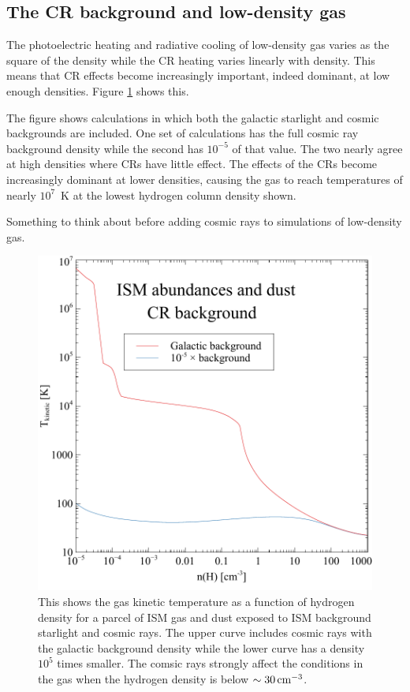 \subsection{The CR background and low-density gas}

The photoelectric heating and radiative cooling of low-density gas varies as the
square of the density while the CR heating varies linearly with density.
This means that CR effects become increasingly important, indeed dominant,
at low enough densities.
Figure \ref{fig:crDensityTemp} shows this.

The figure shows calculations in which both the galactic starlight and cosmic backgrounds 
are included.  
One set of calculations has the full cosmic ray background density while the second
has $10^{-5}$ of that value.  
The two nearly agree at high densities where CRs have little effect.
The effects of the CRs become increasingly dominant at lower densities, causing
the gas to reach temperatures of nearly $10^7$~K at the lowest hydrogen column density shown.

Something to think about before adding cosmic rays to simulations of low-density gas.

\begin{figure}
\centering
\includegraphics[scale=0.7]{crDensityTemp/crDensityTemp}
\caption[Effects of cosmic ray background on gas temperature]
{\label{fig:crDensityTemp}This shows  
the gas kinetic temperature as a function of hydrogen density for a parcel of ISM gas and dust
exposed to  ISM background starlight and cosmic rays.
The upper curve includes cosmic rays with the galactic background density while
the lower curve has a density $10^5$ times smaller.
The comsic rays strongly affect the conditions in the gas when the hydrogen density is below
$\sim 30 {\rm\thinspace cm^{-3}}$.}
\end{figure}



